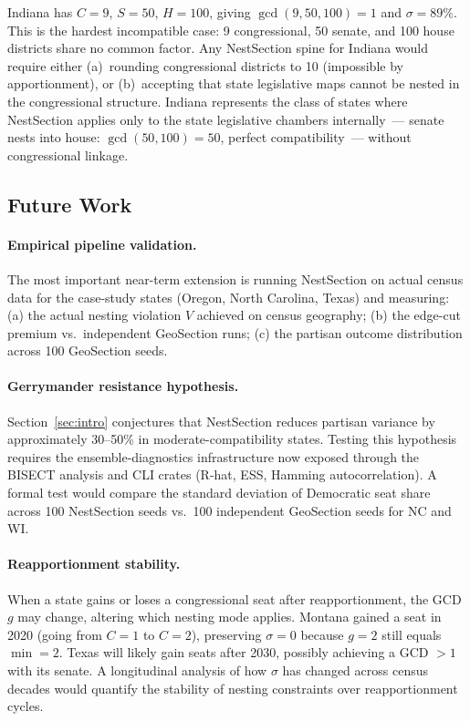 Indiana has $C = 9$, $S = 50$, $H = 100$, giving $\gcd(9, 50, 100) = 1$ and
$\sigma = 89\%$.  This is the hardest incompatible case: 9 congressional, 50
senate, and 100 house districts share no common factor.  Any NestSection spine
for Indiana would require either (a)~rounding congressional districts to 10
(impossible by apportionment), or (b)~accepting that state legislative maps
cannot be nested in the congressional structure.  Indiana represents the class
of states where NestSection applies only to the state legislative chambers
internally~--- senate nests into house: $\gcd(50, 100) = 50$, perfect
compatibility~--- without congressional linkage.

\subsection{Future Work}

\paragraph{Empirical pipeline validation.}
The most important near-term extension is running NestSection on actual census
data for the case-study states (Oregon, North Carolina, Texas) and measuring:
(a) the actual nesting violation $V$ achieved on census geography;
(b) the edge-cut premium vs.\ independent GeoSection runs;
(c) the partisan outcome distribution across 100 GeoSection seeds.

\paragraph{Gerrymander resistance hypothesis.}
Section~\ref{sec:intro} conjectures that NestSection reduces partisan variance
by approximately 30--50\% in moderate-compatibility states.  Testing this
hypothesis requires the ensemble-diagnostics infrastructure now exposed through
the BISECT analysis and CLI crates (R-hat, ESS, Hamming
autocorrelation).  A formal test would compare the standard deviation of
Democratic seat share across 100 NestSection seeds vs.\ 100 independent
GeoSection seeds for NC and WI.

\paragraph{Reapportionment stability.}
When a state gains or loses a congressional seat after reapportionment,
the GCD $g$ may change, altering which nesting mode applies.  Montana gained
a seat in 2020 (going from $C=1$ to $C=2$), preserving $\sigma=0$ because
$g=2$ still equals $\min = 2$.  Texas will likely gain seats after 2030,
possibly achieving a GCD $> 1$ with its senate.  A longitudinal analysis of
how $\sigma$ has changed across census decades would quantify the stability
of nesting constraints over reapportionment cycles.

